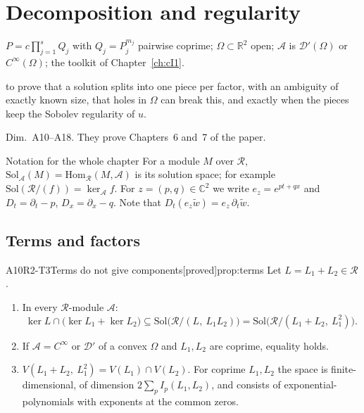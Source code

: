\documentclass[11pt,a4paper,oneside]{report}
\newcommand{\chapterbrief}[3]{\begin{leadin}\begin{description}[itemsep=3pt,leftmargin=3.1cm,labelwidth=2.9cm,font=\sffamily\bfseries\small]
  \item[Starting from] #1
  \item[Why] #2
  \item[Role] #3
  \end{description}\end{leadin}}
\newcommand{\badge}[2]{\textcolor{#1}{\textsf{\footnotesize[#2]}}}
\newcommand{\proved}{\badge{cC}{proved}}
\newcommand{\R}{\mathbb{R}}\newcommand{\C}{\mathbb{C}}\newcommand{\N}{\mathbb{N}}\newcommand{\Z}{\mathbb{Z}}\newcommand{\Q}{\mathbb{Q}}
\newcommand{\ring}{\mathcal{R}}
\newcommand{\Var}{V}
\newenvironment{dimcard}[5]{\par\Needspace{12\baselineskip}\begin{dimcardbox}{#1}{#2}{#3}{#4}{#5}}{\end{dimcardbox}}
\begin{document}


\chapter{Decomposition and regularity}\label{ch:cI2}
\chapterbrief
{$P=c\prod_{j=1}^sQ_j$ with $Q_j=P_j^{m_j}$ pairwise coprime; $\Omega\subset\R^2$ open; $\mathcal A$ is $\mathcal D'(\Omega)$ or $C^\infty(\Omega)$; the toolkit of Chapter~\ref{ch:cI1}.}
{to prove that a solution splits into one piece per factor, with an ambiguity of exactly known size, that holes in $\Omega$ can break this, and exactly when the pieces keep the Sobolev regularity of $u$.}
{Dim.~A10--A18. They prove Chapters~6 and~7 of the paper.}

\begin{notebox}{Notation for the whole chapter}
For a module $M$ over $\ring$, $\mathrm{Sol}_{\mathcal A}(M)=\mathrm{Hom}_\ring(M,\mathcal A)$ is its solution space; for example $\mathrm{Sol}(\ring/(f))=\ker_{\mathcal A}f$. For $z=(p,q)\in\C^2$ we write $e_z=e^{pt+qx}$ and $D_t=\partial_t-p$, $D_x=\partial_x-q$. Note that $D_t(e_z\tilde w)=e_z\,\partial_t\tilde w$.
\end{notebox}

\section{Terms and factors}

\begin{dimcard}{A10}{R2-T3}{Terms do not give components}{\proved}{prop:terms}
Let $L=L_1+L_2\in\ring$.
\begin{enumerate}[label=(\alph*)]
\item In every $\ring$-module $\mathcal A$:
\[
\ker L\cap\big(\ker L_1+\ker L_2\big)\subseteq\mathrm{Sol}\big(\ring/(L,\ L_1L_2)\big)=\mathrm{Sol}\big(\ring/(L_1+L_2,\ L_1^2)\big).
\]
\item If $\mathcal A=C^\infty$ or $\mathcal D'$ of a convex $\Omega$ and $L_1,L_2$ are coprime, equality holds.
\item $\Var(L_1+L_2,\ L_1^2)=\Var(L_1)\cap\Var(L_2)$. For coprime $L_1,L_2$ the space is finite-dimensional, of dimension $2\sum_pI_p(L_1,L_2)$, and consists of exponential-polynomials with exponents at the common zeros.
\end{enumerate}
\end{dimcard}
\end{document}
